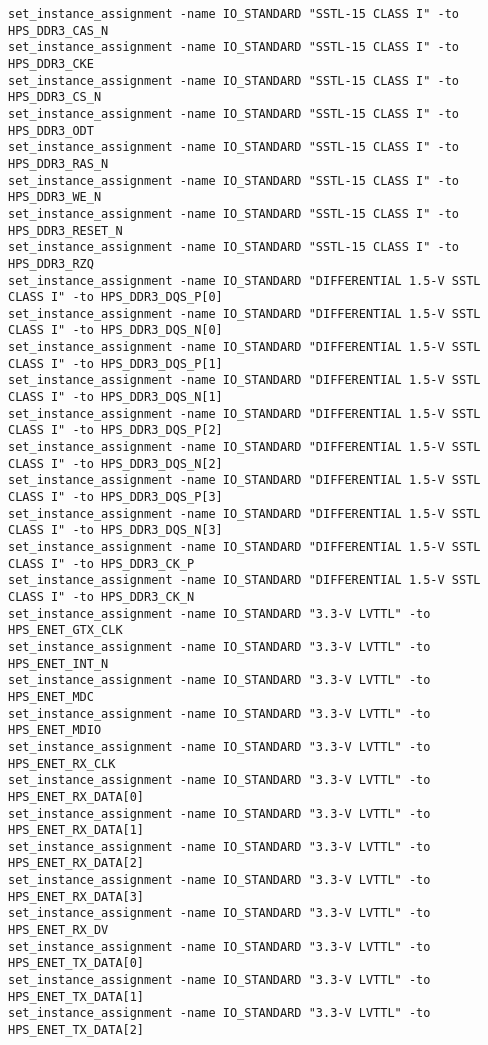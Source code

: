 \begin{verbatim}
set_instance_assignment -name IO_STANDARD "SSTL-15 CLASS I" -to HPS_DDR3_CAS_N
set_instance_assignment -name IO_STANDARD "SSTL-15 CLASS I" -to HPS_DDR3_CKE
set_instance_assignment -name IO_STANDARD "SSTL-15 CLASS I" -to HPS_DDR3_CS_N
set_instance_assignment -name IO_STANDARD "SSTL-15 CLASS I" -to HPS_DDR3_ODT
set_instance_assignment -name IO_STANDARD "SSTL-15 CLASS I" -to HPS_DDR3_RAS_N
set_instance_assignment -name IO_STANDARD "SSTL-15 CLASS I" -to HPS_DDR3_WE_N
set_instance_assignment -name IO_STANDARD "SSTL-15 CLASS I" -to HPS_DDR3_RESET_N
set_instance_assignment -name IO_STANDARD "SSTL-15 CLASS I" -to HPS_DDR3_RZQ
set_instance_assignment -name IO_STANDARD "DIFFERENTIAL 1.5-V SSTL CLASS I" -to HPS_DDR3_DQS_P[0]
set_instance_assignment -name IO_STANDARD "DIFFERENTIAL 1.5-V SSTL CLASS I" -to HPS_DDR3_DQS_N[0]
set_instance_assignment -name IO_STANDARD "DIFFERENTIAL 1.5-V SSTL CLASS I" -to HPS_DDR3_DQS_P[1]
set_instance_assignment -name IO_STANDARD "DIFFERENTIAL 1.5-V SSTL CLASS I" -to HPS_DDR3_DQS_N[1]
set_instance_assignment -name IO_STANDARD "DIFFERENTIAL 1.5-V SSTL CLASS I" -to HPS_DDR3_DQS_P[2]
set_instance_assignment -name IO_STANDARD "DIFFERENTIAL 1.5-V SSTL CLASS I" -to HPS_DDR3_DQS_N[2]
set_instance_assignment -name IO_STANDARD "DIFFERENTIAL 1.5-V SSTL CLASS I" -to HPS_DDR3_DQS_P[3]
set_instance_assignment -name IO_STANDARD "DIFFERENTIAL 1.5-V SSTL CLASS I" -to HPS_DDR3_DQS_N[3]
set_instance_assignment -name IO_STANDARD "DIFFERENTIAL 1.5-V SSTL CLASS I" -to HPS_DDR3_CK_P
set_instance_assignment -name IO_STANDARD "DIFFERENTIAL 1.5-V SSTL CLASS I" -to HPS_DDR3_CK_N
set_instance_assignment -name IO_STANDARD "3.3-V LVTTL" -to HPS_ENET_GTX_CLK
set_instance_assignment -name IO_STANDARD "3.3-V LVTTL" -to HPS_ENET_INT_N
set_instance_assignment -name IO_STANDARD "3.3-V LVTTL" -to HPS_ENET_MDC
set_instance_assignment -name IO_STANDARD "3.3-V LVTTL" -to HPS_ENET_MDIO
set_instance_assignment -name IO_STANDARD "3.3-V LVTTL" -to HPS_ENET_RX_CLK
set_instance_assignment -name IO_STANDARD "3.3-V LVTTL" -to HPS_ENET_RX_DATA[0]
set_instance_assignment -name IO_STANDARD "3.3-V LVTTL" -to HPS_ENET_RX_DATA[1]
set_instance_assignment -name IO_STANDARD "3.3-V LVTTL" -to HPS_ENET_RX_DATA[2]
set_instance_assignment -name IO_STANDARD "3.3-V LVTTL" -to HPS_ENET_RX_DATA[3]
set_instance_assignment -name IO_STANDARD "3.3-V LVTTL" -to HPS_ENET_RX_DV
set_instance_assignment -name IO_STANDARD "3.3-V LVTTL" -to HPS_ENET_TX_DATA[0]
set_instance_assignment -name IO_STANDARD "3.3-V LVTTL" -to HPS_ENET_TX_DATA[1]
set_instance_assignment -name IO_STANDARD "3.3-V LVTTL" -to HPS_ENET_TX_DATA[2]

\end{verbatim}
